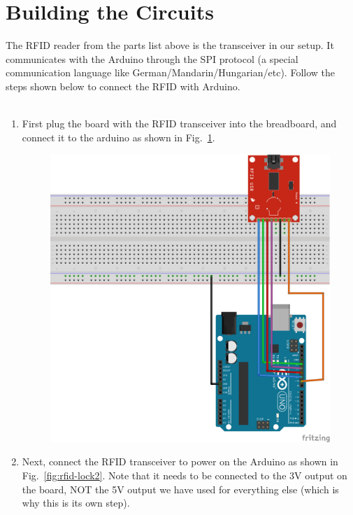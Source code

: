 \documentclass{article}
\begin{document}
\section{Building the Circuits}
The RFID reader from the parts list above is the transceiver in our setup. It
communicates with the Arduino through the SPI protocol (a special communication
language like German/Mandarin/Hungarian/etc). Follow the steps shown below to
connect the RFID with Arduino.
\\
\\
\begin{enumerate}
\item First plug the board with the RFID transceiver into the breadboard, and connect
  it to the arduino as shown in Fig.~\ref{fig:rfid-lock1}.

  \begin{figure}[H]
  \centering
  \includegraphics[width=.7\linewidth]{figures/rfid-lock1_bb.png}
  \caption{\label{fig:rfid-lock1}}
\end{figure}

\item Next, connect the RFID transceiver to power on the Arduino as shown in
  Fig.~\ref{fig:rfid-lock2}. Note that it needs to be connected to the 3V output on
  the board, NOT the 5V output we have used for everything else (which is why this is
  its own step).


\end{enumerate}
\end{document}
